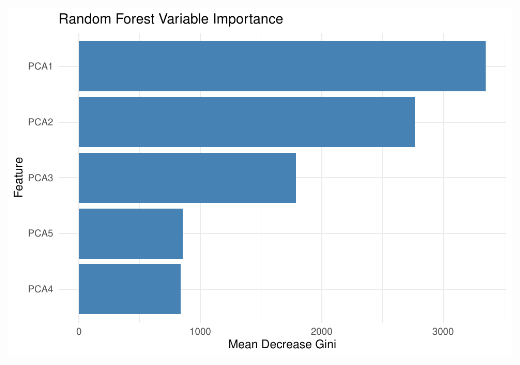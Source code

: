 \documentclass[
]{article}
\begin{document}
\includegraphics{veg_model_files/figure-latex/unnamed-chunk-17-3.pdf}
\end{document}
